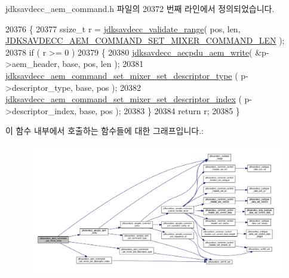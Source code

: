 jdksavdecc\+\_\+aem\+\_\+command.\+h 파일의 20372 번째 라인에서 정의되었습니다.


\begin{DoxyCode}
20376 \{
20377     ssize\_t r = \hyperlink{group__util_ga9c02bdfe76c69163647c3196db7a73a1}{jdksavdecc\_validate\_range}( pos, len, 
      \hyperlink{group__command__set__mixer_ga99895088fc524d7953bca73a5d1f4bf9}{JDKSAVDECC\_AEM\_COMMAND\_SET\_MIXER\_COMMAND\_LEN} );
20378     \textcolor{keywordflow}{if} ( r >= 0 )
20379     \{
20380         \hyperlink{group__aecpdu__aem_gad658e55771cce77cecf7aae91e1dcbc5}{jdksavdecc\_aecpdu\_aem\_write}( &p->aem\_header, base, pos, len );
20381         \hyperlink{group__command__set__mixer_ga81038e8461d90c066a8668ccaa14d993}{jdksavdecc\_aem\_command\_set\_mixer\_set\_descriptor\_type}
      ( p->descriptor\_type, base, pos );
20382         \hyperlink{group__command__set__mixer_gabc9cdae53924a8ed78e5cbe59510b373}{jdksavdecc\_aem\_command\_set\_mixer\_set\_descriptor\_index}
      ( p->descriptor\_index, base, pos );
20383     \}
20384     \textcolor{keywordflow}{return} r;
20385 \}
\end{DoxyCode}


이 함수 내부에서 호출하는 함수들에 대한 그래프입니다.\+:
\nopagebreak
\begin{figure}[H]
\begin{center}
\leavevmode
\includegraphics[width=350pt]{group__command__set__mixer_gaa1bdb4ef380c08b1f361d2741c6aa828_cgraph}
\end{center}
\end{figure}


